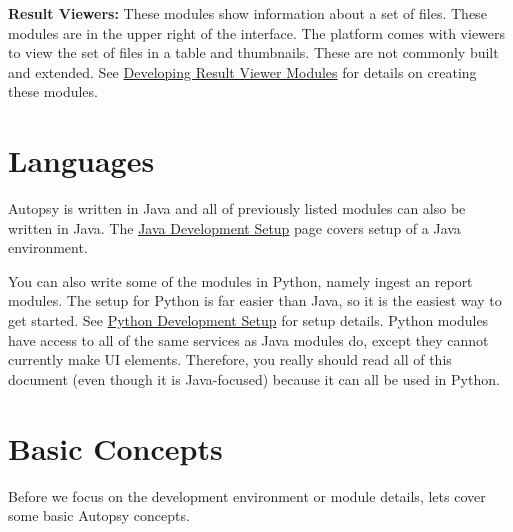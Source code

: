 \begin{DoxyItemize}
\item {\bfseries Result Viewers\+:} These modules show information about a set of files. These modules are in the upper right of the interface. The platform comes with viewers to view the set of files in a table and thumbnails. These are not commonly built and extended. See \hyperlink{mod_result_page}{Developing Result Viewer Modules} for details on creating these modules.
\end{DoxyItemize}\hypertarget{platform_page_platform_languages}{}\section{Languages}\label{platform_page_platform_languages}
Autopsy is written in Java and all of previously listed modules can also be written in Java. The \hyperlink{mod_dev_page}{Java Development Setup} page covers setup of a Java environment.

You can also write some of the modules in Python, namely ingest an report modules. The setup for Python is far easier than Java, so it is the easiest way to get started. See \hyperlink{mod_dev_py_page}{Python Development Setup} for setup details. Python modules have access to all of the same services as Java modules do, except they cannot currently make UI elements. Therefore, you really should read all of this document (even though it is Java-\/focused) because it can all be used in Python.\hypertarget{platform_page_platform_basics}{}\section{Basic Concepts}\label{platform_page_platform_basics}
Before we focus on the development environment or module details, let\textquotesingle{}s cover some basic Autopsy concepts.


